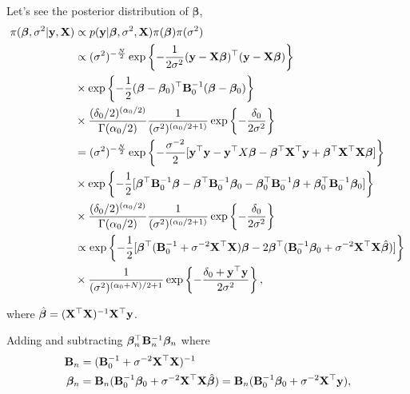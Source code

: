 \begin{enumerate}[leftmargin=*]
Let's see the posterior distribution of $\bm{\beta}$, 
\begin{align*}
	\pi(\bm{\beta}, \sigma^2|{\bf{y}}, {\bf{X}}) & \propto p({\bf{y}}|\bm{\beta}, \sigma^2, {\bf{X}}) \pi(\bm{\beta}) \pi(\sigma^2) \\
	&\propto (\sigma^2)^{-\frac{N}{2}}\exp\left\{-\frac{1}{2\sigma^2}({\bf{y}}-{\bf{X}}\bm{\beta})^{\top}({\bf{y}}-{\bf{X}}\bm{\beta})\right\}\\
	&\times \exp\left\{-\frac{1}{2}(\bm{\beta} - \bm{\beta}_0)^{\top}{\bf{B}}_0^{-1}(\bm{\beta} - \bm{\beta}_0)\right\}\\
	&\times\frac{(\delta_0/2)^{(\alpha_0/2)}}{\Gamma(\alpha_0/2)}\frac{1}{(\sigma^2)^{(\alpha_0/2+1)}}\exp\left\{-\frac{\delta_0}{2\sigma^2}\right\}\\
	&=(\sigma^2)^{-\frac{N}{2}}\exp\left\{-\frac{\sigma^{-2}}{2}[{\bf{y}}^{\top}{\bf{y}}-{\bf{y}}^{\top}X\bm{\beta}-\bm{\beta}^{\top}{\bf{X}}^{\top}{\bf{y}}+\bm{\beta}^{\top}{\bf{X}}^{\top}{\bf{X}}\bm{\beta}]\right\}\\
	& \times \exp\left\{-\frac{1}{2}[\bm{\beta}^{\top}{\bf{B}}_0^{-1}\bm{\beta}-\bm{\beta}^{\top}{\bf{B}}_0^{-1}\bm{\beta}_0-\bm{\beta}_0^{\top}{\bf{B}}_0^{-1}\bm{\beta}+\bm{\beta}_0^{\top}{\bf{B}}_0^{-1}\bm{\beta}_0]\right\}\\
	&\times \frac{(\delta_0/2)^{(\alpha_0/2)}}{\Gamma(\alpha_0/2)}\frac{1}{(\sigma^2)^{(\alpha_0/2+1)}}\exp\left\{-\frac{\delta_0}{2\sigma^2}\right\}\\
	&\propto \exp\left\{-\frac{1}{2}[\bm{\beta}^{\top}({\bf{B}}_0^{-1}+\sigma^{-2}{\bf{X}}^{\top}{\bf{X}})\bm{\beta}-2\bm{\beta}^{\top}({\bf{B}}_0^{-1}\bm{\beta}_0+\sigma^{-2}{\bf{X}}^{\top}{\bf{X}}\hat{\bm{\beta}})]\right\}\\
	&\times\frac{1}{(\sigma^2)^{(\alpha_0+N)/2+1}}\exp\left\{-\frac{\delta_0+{\bf{y}}^{\top}{\bf{y}}}{2\sigma^2}\right\},
\end{align*}

where $\hat{\bm{\beta}}=({\bf{X}}^{\top}{\bf{X}})^{-1}{\bf{X}}^{\top}{\bf{y}}$.

Adding and subtracting $\bm{\beta}_n^{\top}{\bf{B}}_n^{-1}\bm{\beta}_n$ where
\begin{align*}
	{\bf{B}}_n & = ({\bf{B}}_0^{-1}+\sigma^{-2}{\bf{X}}^{\top}{\bf{X}})^{-1}\\
	\bm{\beta}_n&={\bf{B}}_n({\bf{B}}_0^{-1}\bm{\beta}_0+\sigma^{-2}{\bf{X}}^{\top}{\bf{X}}\hat{\bm{\beta}})={\bf{B}}_n({\bf{B}}_0^{-1}\bm{\beta}_0+\sigma^{-2}{\bf{X}}^{\top}{\bf{y}}),
\end{align*}


\end{enumerate}
